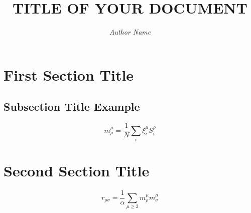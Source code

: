 \documentclass{article}
\title{\LARGE\scshape\MakeUppercase{Title of Your Document}}  %
\author{\textit{Author Name}}  %
\date{}  %
\begin{document}
\maketitle


\section{First Section Title}

\subsection{Subsection Title Example}

\begin{equation}
m_\rho^\mu = \frac{1}{N} \sum_i \xi_i^\mu S_i^\rho
\end{equation}

\clearpage

\section{Second Section Title}

\begin{equation}
r_{\rho \sigma} = \frac{1}{\alpha} \sum_{\mu \geq 2} m_\rho^\mu m_\sigma^\mu
\end{equation}

\end{document}
